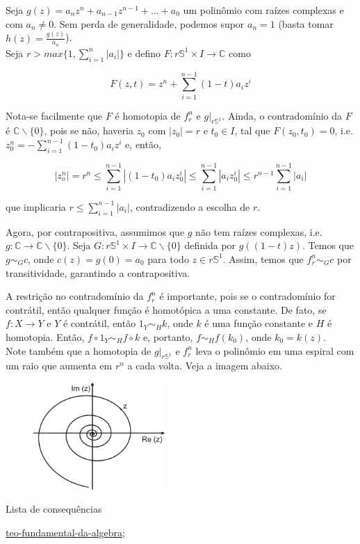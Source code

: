\begin{dem}
    Seja $g(z) = a_nz^n + a_{n - 1}z^{n - 1} +...+ a_0$
um polinômio com raízes complexas e com $a_n \neq 0$. Sem perda de generalidade, podemos supor $a_n = 1$ (basta tomar $h(z) = \frac{g(z)}{a_n}$).\\ Seja $r > max\{1, \sum_{i = 1}^n|a_i|\}$ e defino $F:r\mathbb{S}^1\times I \rightarrow \mathbb{C}$ como

$$F(z, t) = z^n + \sum_{i = 1}^{n-1}(1 - t)a_iz^i$$

Nota-se facilmente que $F$ é homotopia de $f_r^n$ e $g|_{r\mathbb{S}^1}$. Ainda, o contradomínio da $F$ é $\mathbb{C}\backslash \{0\}$, pois se não, haveria $z_0$ com $|z_0| = r$ e $t_0 \in I$, tal que $F(z_0, t_0) = 0$, i.e. $z_0^n = -\sum_{i = 1}^{n - 1}(1 - t_0)a_iz^i$ e, então, 

$$|z_o^n| = r^n \leq \sum_{i = 1}^{n - 1}|(1 - t_0)a_iz_0^i| \leq \sum_{i = 1}^{n - 1}|a_iz_0^i| \leq r^{n-1}\sum_{i = 1}^{n - 1}|a_i|$$

que implicaria $r \leq \sum_{i = 1}^{n - 1}|a_i|$, contradizendo a escolha de $r$.

Agora, por contrapositiva, assumimos que $g$ não tem raízes complexas, i.e. $g:\mathbb{C} \rightarrow \mathbb{C}\backslash\{0\}$. Seja $G: r\mathbb{S}^1\times I \rightarrow \mathbb{C}\backslash\{0\}$ definida por $g((1 - t)z)$. Temos que $g \sim_G c$, onde $c(z) = g(0) = a_0$ para todo $z \in r\mathbb{S}^1$. Assim, temos que $f_r^n \sim_G c$ por transitividade, garantindo a contrapositiva.  

\end{dem}
A restrição no contradomínio da $f_r^n$ é importante, pois se o contradomínio for contrátil, então qualquer função é homotópica a uma constante. De fato, se $f:X \rightarrow Y$ e $Y$ é contrátil, então $1_Y \sim_H k$, onde $k$ é uma função constante e $H$ é homotopia. Então, $f\circ1_Y \sim_H f\circ k$ e, portanto, $f \sim_H f(k_0)$, onde $k_0 = k(z)$. \\

Note também que a homotopia de $g|_{r\mathbb{S}^1}$ e $f_r^n$ leva o polinômio em uma espiral com um raio que aumenta em $r^n$ a cada volta. Veja a imagem abaixo.
\begin{figure}[h]
\includegraphics[width = 5cm]{espiral.png}
\end{figure}

\begin{titlemize}{Lista de consequências}
	\item \hyperref[teo-fundamental-da-algebra]{teo-fundamental-da-algebra};\\ 
	
\end{titlemize}
